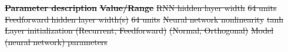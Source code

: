 \documentclass[5p,twocolumn,authoryear]{elsarticle}
\providecommand{\DIFdeltex}[1]{{\protect\color{red}\sout{#1}}}                      %
\providecommand{\DIFdelFL}[1]{\DIFdel{#1}} %
\providecommand{\DIFdel}[1]{\texorpdfstring{\DIFdeltex{#1}}{}} %
\begin{document}
\textbf{\DIFdelFL{Parameter description}} %
\textbf{\DIFdelFL{Value/Range}} %
\DIFdelFL{RNN hidden layer width }%
\DIFdelFL{64 units  }%
\DIFdelFL{Feedforward hidden layer width(s) }%
\DIFdelFL{64 units  }%
\DIFdelFL{Neural network nonlinearity }%
\DIFdelFL{tanh  }%
\DIFdelFL{Layer initialization (Recurrent, Feedforward) }%
\DIFdelFL{(Normal, Orthogonal)  }%
{%
\DIFdelFL{Model (neural network) parameters}}
\end{document}
